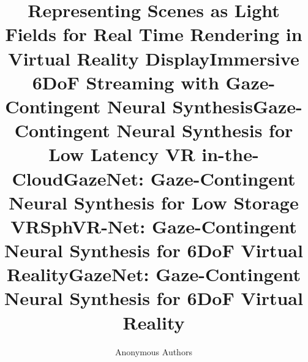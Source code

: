 \title{Representing Scenes as Light Fields for Real Time Rendering in Virtual Reality Display}
\title{Immersive 6DoF Streaming with Gaze-Contingent Neural Synthesis} 
\title{Gaze-Contingent Neural Synthesis for Low Latency VR in-the-Cloud} 
\title{GazeNet: Gaze-Contingent Neural Synthesis for Low Storage VR} 
\title{SphVR-Net: Gaze-Contingent Neural Synthesis for 6DoF Virtual Reality}
\title{GazeNet: Gaze-Contingent Neural Synthesis for 6DoF Virtual Reality} 


\author{Anonymous Authors}
